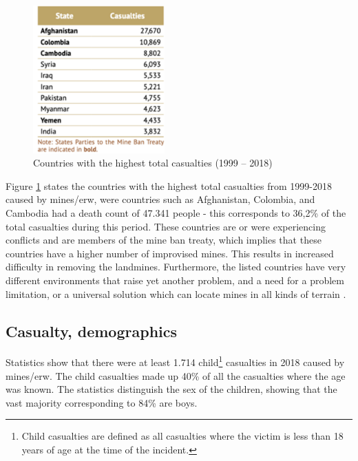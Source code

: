         \vspace{2mm}

\begin{figure}
    \vspace{-5mm}
    \centering
      \includegraphics[width=0.45\textwidth]{00 - Images/casualties_per_country.png}
  \caption{Countries with the highest total casualties (1999 – 2018) \cite{LandmineMonitor2019}}
  \label{fig:casualties_per_country}
\end{figure}

Figure \ref{fig:casualties_per_country} states the countries with the highest total casualties from 1999-2018 caused by mines/\gls{erw}, were countries such as Afghanistan, Colombia, and Cambodia had a death count of 47.341 people - this corresponds to 36,2\% of the total casualties during this period. These countries are or were experiencing conflicts and are members of the mine ban treaty, which implies that these countries have a higher number of improvised mines. This results in increased difficulty in removing the landmines. Furthermore, the listed countries have very different environments that raise yet another problem, and a need for a problem limitation, or a universal solution which can locate mines in all kinds of terrain \cite{LandmineMonitor2019}.

\clearpage

\subsection{Casualty, demographics}
Statistics show that there were at least 1.714 child\footnote{Child casualties are defined as all casualties where the victim is less than 18 years of age at the time of the incident.} casualties in 2018 caused by mines/\gls{erw}. The child casualties made up 40\% of all the casualties where the age was known. The statistics distinguish the sex of the children, showing that the vast majority corresponding to 84\% are boys.

